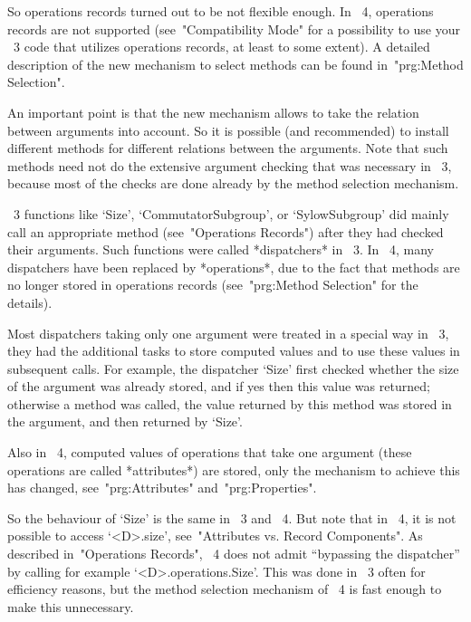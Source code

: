 So operations records turned out to be not flexible enough.
In {\GAP}~4, operations records are not supported
(see~"Compatibility Mode" for a possibility to use your {\GAP}~3 code
that utilizes operations records, at least to some extent).
A detailed description of the new mechanism to select methods can be
found in~"prg:Method Selection".

An important point is that the new mechanism allows {\GAP} to take the
relation between arguments into account.
So it is possible (and recommended) to install different methods for
different relations between the arguments.
Note that such methods need not do the extensive argument checking
that was necessary in {\GAP}~3, because most of the checks are done
already by the method selection mechanism.



{\GAP}~3 functions like `Size', `CommutatorSubgroup', or `SylowSubgroup'
did mainly call an appropriate method (see~"Operations Records")
after they had checked their arguments.
Such functions were called *dispatchers* in {\GAP}~3.
In {\GAP}~4, many dispatchers have been replaced by *operations*,
due to the fact that methods are no longer stored in operations records
(see~"prg:Method Selection" for the details).

Most dispatchers taking only one argument were treated in a special way
in {\GAP}~3, they had the additional tasks to store computed values
and to use these values in subsequent calls.
For example, the dispatcher `Size' first checked whether the size of the
argument was already stored, and if yes then this value was returned;
otherwise a method was called, the value returned by this method was
stored in the argument, and then returned by `Size'.

Also in {\GAP}~4, computed values of operations that take one argument
(these operations are called *attributes*) are stored,
only the mechanism to achieve this has changed,
see~"prg:Attributes" and~"prg:Properties".

So the behaviour of `Size' is the same in {\GAP}~3 and {\GAP}~4.
But note that in {\GAP}~4, it is not possible to access `<D>.size',
see~"Attributes vs. Record Components".
As described in~"Operations Records", {\GAP}~4 does not admit ``bypassing
the dispatcher'' by calling for example `<D>.operations.Size'.
This was done in {\GAP}~3 often for efficiency reasons,
but the method selection mechanism of {\GAP}~4 is fast enough to make
this unnecessary.

